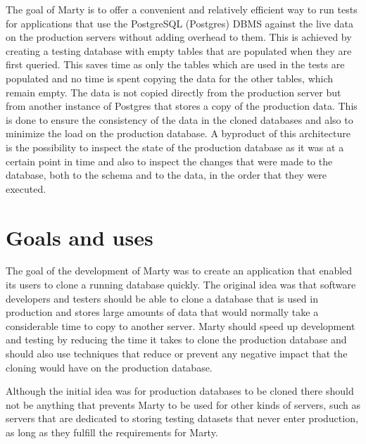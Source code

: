 \documentclass[a4paper,12pt,twoside,BCOR=10mm]{scrbook}
\begin{document}
The goal of Marty is to offer a convenient and relatively efficient way to run tests for applications that use the PostgreSQL (Postgres) DBMS against the live data on the production servers without adding overhead to them. This is achieved by creating a testing database with empty tables that are populated  when they are first queried. This saves time as only the tables which are used in the tests are populated and no time is spent copying the data for the other tables, which remain empty. The data is not copied directly from the production server but from another instance of Postgres that stores a copy of the production data. This is done to ensure the consistency of the data in the cloned databases and also to minimize the load on the production database. A byproduct of this architecture is the possibility to inspect the state of the production database as it was at a certain point in time and also to inspect the changes that were made to the database, both to the schema and to the data, in the order that they were executed.


\chapter{Goals and uses}
The goal of the development of Marty was to create an application that enabled its users to clone a running database quickly. The original idea was that software developers and testers should be able to clone a database that is used in production and stores large amounts of data that would normally take a considerable time to copy to another server. Marty should speed up development and testing by reducing the time it takes to clone the production database and should also use techniques that reduce or prevent any negative impact that the cloning would have on the production database. 

Although the initial idea was for production databases to be cloned there should not be anything that prevents Marty to be used for other kinds of servers, such as servers that are dedicated to storing testing datasets that never enter production, as long as they fulfill the requirements for Marty.
\end{document}
